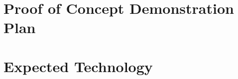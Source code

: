\documentclass{article}
\begin{document}


\section{Proof of Concept Demonstration Plan}



\section{Expected Technology}




\end{document}
